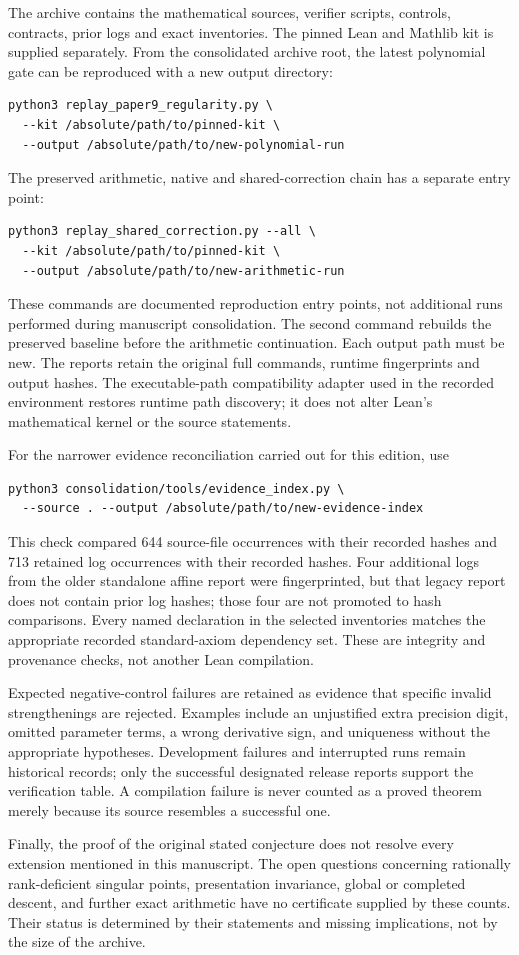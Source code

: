 The archive contains the mathematical sources, verifier scripts, controls,
contracts, prior logs and exact inventories. The pinned Lean and Mathlib kit
is supplied separately. From the consolidated archive root, the latest
polynomial gate can be reproduced with a new output directory:
\begin{verbatim}
python3 replay_paper9_regularity.py \
  --kit /absolute/path/to/pinned-kit \
  --output /absolute/path/to/new-polynomial-run
\end{verbatim}
The preserved arithmetic, native and shared-correction chain has a separate
entry point:
\begin{verbatim}
python3 replay_shared_correction.py --all \
  --kit /absolute/path/to/pinned-kit \
  --output /absolute/path/to/new-arithmetic-run
\end{verbatim}
These commands are documented reproduction entry points, not additional
runs performed during manuscript consolidation. The second command rebuilds
the preserved baseline before the arithmetic continuation. Each output path
must be new. The reports retain the original full commands, runtime
fingerprints and output hashes. The executable-path compatibility adapter
used in the recorded environment restores runtime path discovery; it does
not alter Lean's mathematical kernel or the source statements.

For the narrower evidence reconciliation carried out for this edition, use
\begin{verbatim}
python3 consolidation/tools/evidence_index.py \
  --source . --output /absolute/path/to/new-evidence-index
\end{verbatim}
This check compared 644 source-file occurrences with their recorded hashes
and 713 retained log occurrences with their recorded hashes. Four additional
logs from the older standalone affine report were fingerprinted, but that
legacy report does not contain prior log hashes; those four are not promoted
to hash comparisons. Every named declaration in the selected inventories
matches the appropriate recorded standard-axiom dependency set. These are
integrity and provenance checks, not another Lean compilation.

Expected negative-control failures are retained as evidence that specific
invalid strengthenings are rejected. Examples include an unjustified extra
precision digit, omitted parameter terms, a wrong derivative sign, and
uniqueness without the appropriate hypotheses. Development failures and
interrupted runs remain historical records; only the successful designated
release reports support the verification table. A compilation failure is
never counted as a proved theorem merely because its source resembles a
successful one.

Finally, the proof of the original stated conjecture does not resolve every
extension mentioned in this manuscript. The open questions concerning
rationally rank-deficient singular points, presentation invariance, global
or completed descent, and further exact arithmetic have no certificate
supplied by these counts. Their status is determined by their statements and
missing implications, not by the size of the archive.
